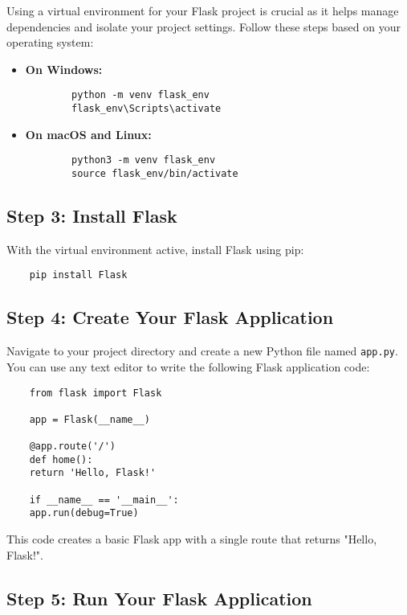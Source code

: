 Using a virtual environment for your Flask project is crucial as it helps manage dependencies and isolate your project settings. Follow these steps based on your operating system:

\begin{itemize}
	\item \textbf{On Windows:}
	\begin{verbatim}
		python -m venv flask_env
		flask_env\Scripts\activate
	\end{verbatim}
	\item \textbf{On macOS and Linux:}
	\begin{verbatim}
		python3 -m venv flask_env
		source flask_env/bin/activate
	\end{verbatim}
\end{itemize}

\subsection{Step 3: Install Flask}

With the virtual environment active, install Flask using pip:

\begin{verbatim}
	pip install Flask
\end{verbatim}

\subsection{Step 4: Create Your Flask Application}

Navigate to your project directory and create a new Python file named \texttt{app.py}. You can use any text editor to write the following Flask application code:

\begin{verbatim}
	from flask import Flask
	
	app = Flask(__name__)
	
	@app.route('/')
	def home():
	return 'Hello, Flask!'
	
	if __name__ == '__main__':
	app.run(debug=True)
\end{verbatim}

This code creates a basic Flask app with a single route that returns "Hello, Flask!".

\subsection{Step 5: Run Your Flask Application}

